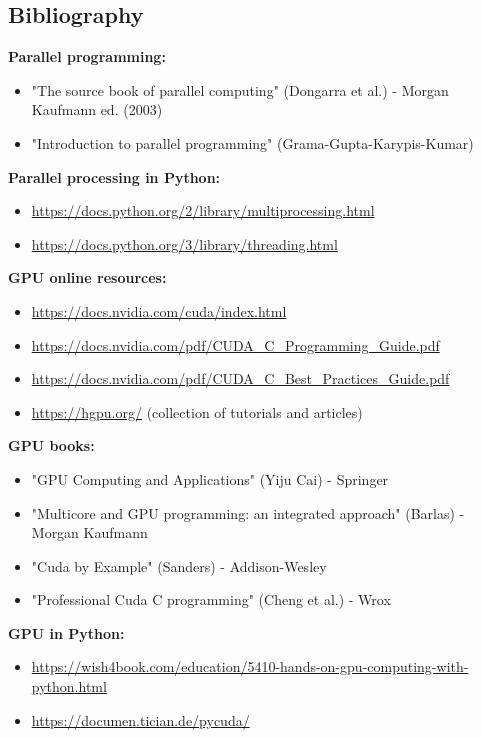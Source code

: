 \subsection{Bibliography}
\textbf{Parallel programming:}
\begin{itemize}
    \item[-] "The source book of parallel computing" (Dongarra et al.) - Morgan Kaufmann ed. (2003)
    \item[-] "Introduction to parallel programming" (Grama-Gupta-Karypis-Kumar)
\end{itemize}
\textbf{Parallel processing in Python:}
\begin{itemize}
    \item[-] \url{https://docs.python.org/2/library/multiprocessing.html}
    \item[-] \url{https://docs.python.org/3/library/threading.html}
\end{itemize}
\textbf{GPU online resources:}
\begin{itemize}
    \item[-] \url{https://docs.nvidia.com/cuda/index.html}
    \item[-] \url{https://docs.nvidia.com/pdf/CUDA_C_Programming_Guide.pdf}
    \item[-] \url{https://docs.nvidia.com/pdf/CUDA_C_Best_Practices_Guide.pdf}
    \item[-] \url{https://hgpu.org/} (collection of tutorials and articles)
\end{itemize}
\textbf{GPU books:}
\begin{itemize}
    \item[-] "GPU Computing and Applications" (Yiju Cai) - Springer
    \item[-] "Multicore and GPU programming: an integrated approach" (Barlas) - Morgan Kaufmann
    \item[-] "Cuda by Example" (Sanders) - Addison-Wesley
    \item[-] "Professional Cuda C programming" (Cheng et al.) - Wrox
\end{itemize}
\textbf{GPU in Python:}
\begin{itemize}
    \item[-] \url{https://wish4book.com/education/5410-hands-on-gpu-computing-with-python.html}
    \item[-] \url{https://documen.tician.de/pycuda/}
\end{itemize}